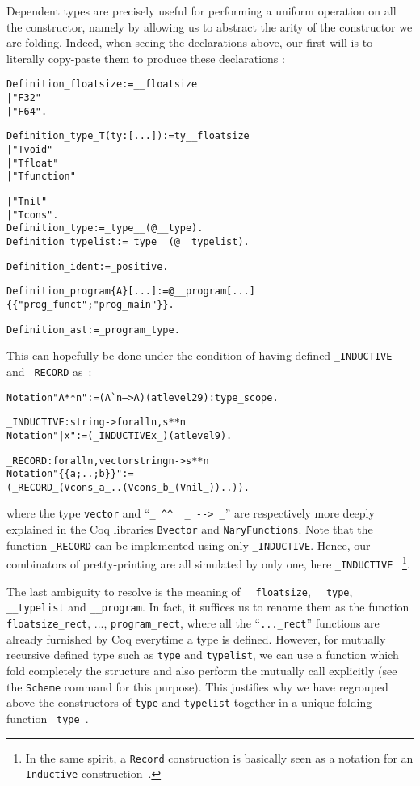 \documentclass[a4paper, 11pt]{article}
\newenvironment{coq}
  {%
   \begin{alltt}
   \footnotesize} %% 8.3pl2 (April 2011)
  {\end{alltt} %
  }
\begin{document}
Dependent types are precisely useful for performing a uniform operation on all the constructor, namely by allowing us to abstract the arity of the constructor we are folding. Indeed, when seeing the declarations above, our first will is to literally copy-paste them to produce these declarations :
\begin{coq}
Definition _floatsize := __floatsize 
  | "F32" 
  | "F64".

Definition _type_ T (ty : [...]) := ty _ _floatsize
  | "Tvoid"
  | "Tfloat"
  | "Tfunction"

  | "Tnil"
  | "Tcons".
  Definition _type := _type_ _ (@__type).
  Definition _typelist := _type_ _ (@__typelist).

Definition _ident := _positive.

Definition _program \{A\} [...] := @__program [...]
  \{\{ "prog_funct" ; "prog_main" \}\}.

Definition _ast := _program _type.
\end{coq}

This can hopefully be done under the condition of having defined \verb|_INDUCTIVE| and \verb|_RECORD| as~:
\begin{coq}
  Notation "A ** n" := (A ^^ n --> A) (at level 29) : type_scope.

_INDUCTIVE : string -> forall n, s ** n
  Notation "| x" := (_INDUCTIVE x _) (at level 9).

_RECORD : forall n, vector string n -> s ** n
  Notation "\{\{ a ; .. ; b \}\}" := 
    (_RECORD _ (Vcons _ a _ .. (Vcons _ b _ (Vnil _)) ..)).
\end{coq}
where the type \verb|vector| and ``\verb|_ ^^  _ --> _|'' are respectively more deeply explained in the Coq libraries \verb|Bvector| and \verb|NaryFunctions|.
Note that the function \verb|_RECORD| can be implemented using only \verb|_INDUCTIVE|. Hence, our combinators of pretty-printing are all simulated by only one, here \verb|_INDUCTIVE|~
\footnote{In the same spirit, a {\tt Record} construction is basically seen as a notation for an {\tt Inductive} construction~\cite{Coq:manual}. %
}.

The last ambiguity to resolve is the meaning of \verb|__floatsize|, \verb|__type|, \verb|__typelist| and \verb|__program|. In fact, it suffices us to rename them as the function \verb|floatsize_rect|, ..., \verb|program_rect|, where all the ``\verb|..._rect|'' functions are already furnished by Coq everytime a type is defined. However, for mutually recursive defined type such as \verb|type| and \verb|typelist|, we can use a function which fold completely the structure and also perform the mutually call explicitly (see the \verb|Scheme| command for this purpose). This justifies why we have regrouped above the constructors of \verb|type| and \verb|typelist| together in a unique folding function \verb|_type_|.
\end{document}
